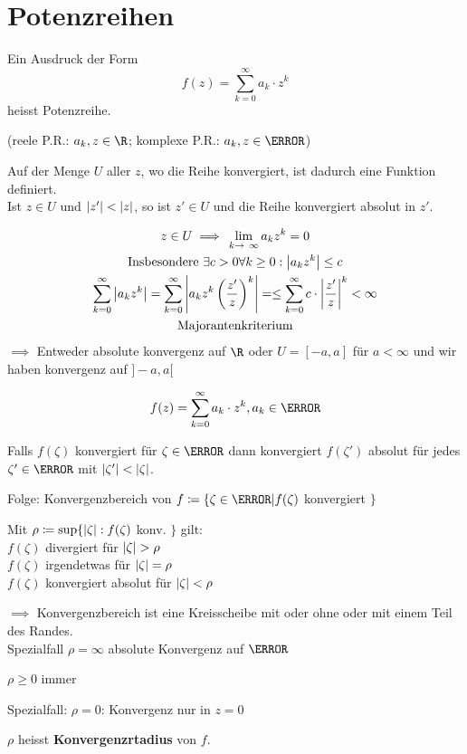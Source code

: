 \chapter{Potenzreihen}
\begin{def*}[note = Potenzreihe , index = Potenzreihe]
	Ein Ausdruck der Form
	\[ f(z) = \sum_{k=0}^\infty a_k \cdot z^k \]
	heisst Potenzreihe.
	
	(reele P.R.: $a_k, z \in \R$; komplexe P.R.: $a_k, z \in \C$)
\end{def*}
\begin{fakt}
	Auf der Menge $U$ aller $z$, wo die Reihe konvergiert, ist dadurch eine Funktion definiert.\\
	Ist $z \in U$ und $\abs{z'} < \abs{z}$, so ist $z' \in U$ und die Reihe konvergiert absolut in $z'$.\\
	\begin{bew}
		\begin{gather*}
			z \in U \implies \lim_{k \rightarrow \infty} a_k z^k = 0 \\
			\text{Insbesondere } \exists c > 0 \forall k \geq 0 : \abs{a_k z^k} \leq c \\
			\sum_{k=0}^\infty \abs{a_k z^k} = \sum_{k=0}^\infty \abs{a_k z^k \left( \frac{z'}{z} \right)^k} = \leq \sum_{k=0}^\infty c \cdot \abs{\frac{z'}{z}}^k < \infty \\
			\text{Majorantenkriterium}
		\end{gather*}
		$\implies$ Entweder absolute konvergenz auf $\R$ oder $U = [-a,a]$ für $a < \infty$ und wir haben konvergenz auf $]-a,a[$
	\end{bew}
\end{fakt}

\[ f(z) = \sum_{k=0}^\infty a_k \cdot z^k, a_k \in \C \]

\begin{fakt}
	Falls $f(\zeta)$ konvergiert für $\zeta \in \C$ dann konvergiert $f(\zeta')$ absolut für jedes $\zeta' \in \C$ mit $\abs{\zeta'} < \abs{\zeta}$.
	
	Folge: Konvergenzbereich von $f \coloneqq \{ \zeta \in \C | f(\zeta)$ konvergiert $\}$
	
	Mit $\rho \coloneqq \sup\{ \abs{\zeta} : f(\zeta)$ konv. $\}$ gilt: \\
	$f(\zeta)$ divergiert für $\abs{\zeta} > \rho$\\
	$f(\zeta)$ irgendetwas für $\abs{\zeta} = \rho$\\
	$f(\zeta)$ konvergiert absolut für $\abs{\zeta} < \rho$
	
	$\implies$ Konvergenzbereich ist eine Kreisscheibe mit oder ohne oder mit einem Teil des Randes.\\
	Spezialfall $\rho = \infty$ absolute Konvergenz auf $\C$
	
	\begin{bem}
		$\rho \geq 0$ immer
	\end{bem}
	Spezialfall: $\rho = 0$: Konvergenz nur in $z=0$
\end{fakt}
\begin{def*}[note = Konvergenzradius , index = Konvergenzradius]
	$\rho$ heisst \textbf{Konvergenzrtadius} von $f$.
\end{def*}

